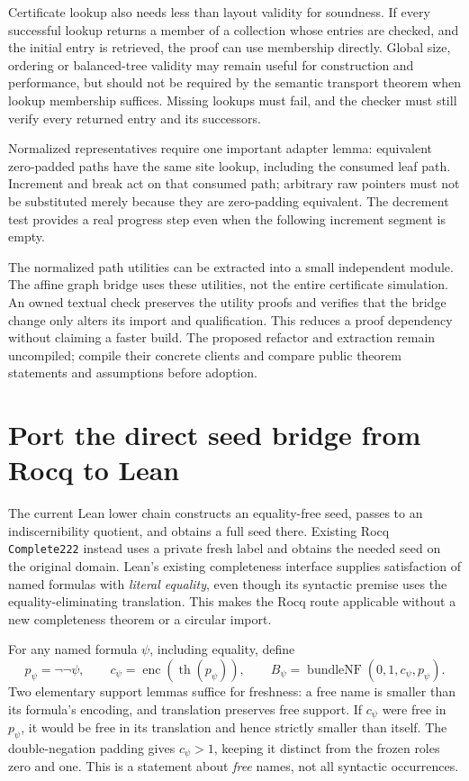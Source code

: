 \documentclass[11pt]{article}
\begin{document}
Certificate lookup also needs less than layout validity for soundness. If every successful lookup returns a member of a collection whose entries are checked, and the initial entry is retrieved, the proof can use membership directly. Global size, ordering or balanced-tree validity may remain useful for construction and performance, but should not be required by the semantic transport theorem when lookup membership suffices. Missing lookups must fail, and the checker must still verify every returned entry and its successors.

Normalized representatives require one important adapter lemma: equivalent zero-padded paths have the same site lookup, including the consumed leaf path. Increment and break act on that consumed path; arbitrary raw pointers must not be substituted merely because they are zero-padding equivalent. The decrement test provides a real progress step even when the following increment segment is empty.

The normalized path utilities can be extracted into a small independent module. The affine graph bridge uses these utilities, not the entire certificate simulation. An owned textual check preserves the utility proofs and verifies that the bridge change only alters its import and qualification. This reduces a proof dependency without claiming a faster build. The proposed refactor and extraction remain uncompiled; compile their concrete clients and compare public theorem statements and assumptions before adoption.


\section{Port the direct seed bridge from Rocq to Lean}
The current Lean lower chain constructs an equality-free seed, passes to an indiscernibility quotient, and obtains a full seed there. Existing Rocq \texttt{Complete222} instead uses a private fresh label and obtains the needed seed on the original domain. Lean's existing completeness interface supplies satisfaction of named formulas with \emph{literal equality}, even though its syntactic premise uses the equality-eliminating translation. This makes the Rocq route applicable without a new completeness theorem or a circular import.

For any named formula $\psi$, including equality, define
\[
 p_\psi=\neg\neg\psi,\qquad
 c_\psi=\operatorname{enc}(\operatorname{th}(p_\psi)),\qquad
 B_\psi=\operatorname{bundleNF}(0,1,c_\psi,p_\psi).
\]
Two elementary support lemmas suffice for freshness: a free name is smaller than its formula's encoding, and translation preserves free support. If $c_\psi$ were free in $p_\psi$, it would be free in its translation and hence strictly smaller than itself. The double-negation padding gives $c_\psi>1$, keeping it distinct from the frozen roles zero and one. This is a statement about \emph{free} names, not all syntactic occurrences.
\end{document}
